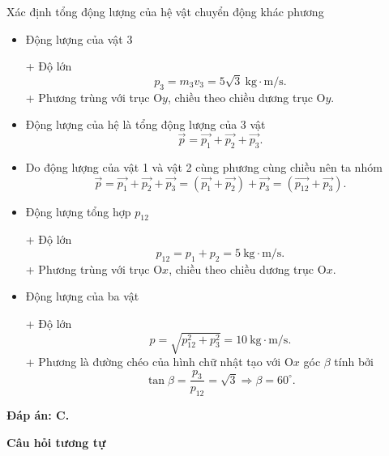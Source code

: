 \begin{dang}{Xác định tổng động lượng của hệ vật chuyển động khác phương}
{\begin{itemize}
			+ Độ lớn
			\begin{equation*}
				p_2=m_2v_2=3 \ \text{kg} \cdot \text{m/s}. 
			\end{equation*}
			+ Phương trùng với trục O$x$, chiều theo chiều dương trục O$x$.
			\item Động lượng của vật 3
			
			+ Độ lớn
			\begin{equation*}
				p_3=m_3v_3 =5\sqrt 3 \ \text{kg} \cdot \text{m/s}. 
			\end{equation*}
			+ Phương trùng với trục O$y$, chiều theo chiều dương trục O$y$.
			\item Động lượng của hệ là tổng động lượng của 3 vật 
			\begin{equation*}
				\vec{p} =\vec{p_1}+\vec{p_2} + \vec{p_3}.
			\end{equation*}
			\item Do động lượng của vật 1 và vật 2 cùng phương cùng chiều nên ta nhóm
			\begin{equation*}
				\vec{p} =\vec{p_1}+\vec{p_2} + \vec{p_3} = (\vec{p_1}+\vec{p_2})+ \vec{p_3} = (\vec{p_{12}}+\vec{p_3}).
			\end{equation*}
			\item Động lượng tổng hợp $p_{12}$
			
			+ Độ lớn
			\begin{equation*}
				p_{12} = p_1 +p_2  =5\ \text{kg} \cdot \text{m/s}. 
			\end{equation*}
			+ Phương trùng với trục O$x$, chiều theo chiều dương trục O$x$. 
			\item Động lượng của ba vật 
			
			+ Độ lớn 
			\begin{equation*}
				p = \sqrt {p_{12}^2+p_3^2} =10\ \text{kg} \cdot \text{m/s}. 
			\end{equation*}
			+ Phương là đường chéo của hình chữ nhật tạo với O$x$ góc $\beta$ tính bởi
			\begin{equation*}
				\tan \beta =\dfrac{p_3}{p_{12}} =\sqrt 3 \Rightarrow \beta = 60^\circ. 
			\end{equation*}
			
		\end{itemize}
		
		\textbf{Đáp án: C.}
		
		\begin{center}
			\textbf{Câu hỏi tương tự}
		\end{center}
		
}
\end{dang}
